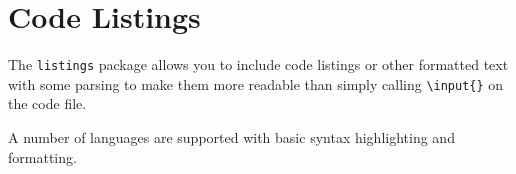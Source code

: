 
\section{Code Listings}\label{sec:code}

The \texttt{listings} package allows you to include code listings or other formatted text with some parsing to make them more readable than simply calling \texttt{\textbackslash{}input\{\}} on the code file.

\lstset{language=matlab}
\lstset{basicstyle=\scriptsize}
\lstset{linewidth=\textwidth}
\lstset{commentstyle=\textit}
\lstset{frame=trbl,frameround=tttt}


A number of languages are supported with basic syntax highlighting and formatting.



